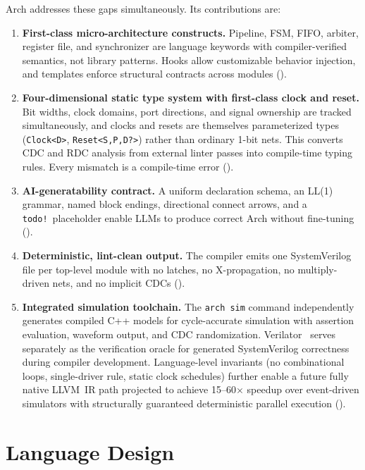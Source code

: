 \documentclass[11pt,twocolumn]{article}
\begin{document}
Arch addresses these gaps simultaneously. Its contributions are:

\begin{enumerate}
\item \textbf{First-class micro-architecture constructs.} Pipeline, FSM, FIFO, arbiter, register file, and synchronizer are language keywords with compiler-verified semantics, not library patterns. Hooks allow customizable behavior injection, and templates enforce structural contracts across modules ().

\item \textbf{Four-dimensional static type system with first-class clock and reset.} Bit widths, clock domains, port directions, and signal ownership are tracked simultaneously, and clocks and resets are themselves parameterized types (\texttt{Clock<D>}, \texttt{Reset<S,P,D?>}) rather than ordinary 1-bit nets. This converts CDC and RDC analysis from external linter passes into compile-time typing rules. Every mismatch is a compile-time error ().

\item \textbf{AI-generatability contract.} A uniform declaration schema, an LL(1) grammar, named block endings, directional connect arrows, and a \texttt{todo!}\ placeholder enable LLMs to produce correct Arch without fine-tuning ().

\item \textbf{Deterministic, lint-clean output.} The compiler emits one SystemVerilog file per top-level module with no latches, no X-propagation, no multiply-driven nets, and no implicit CDCs ().

\item \textbf{Integrated simulation toolchain.} The \texttt{arch sim} command independently generates compiled C++ models for cycle-accurate simulation with assertion evaluation, waveform output, and CDC randomization. Verilator~\cite{verilator} serves separately as the verification oracle for generated SystemVerilog correctness during compiler development. Language-level invariants (no combinational loops, single-driver rule, static clock schedules) further enable a future fully native LLVM~IR path projected to achieve 15--60$\times$ speedup over event-driven simulators with structurally guaranteed deterministic parallel execution ().
\end{enumerate}

\section{Language Design}\label{sec:design}
\end{document}
